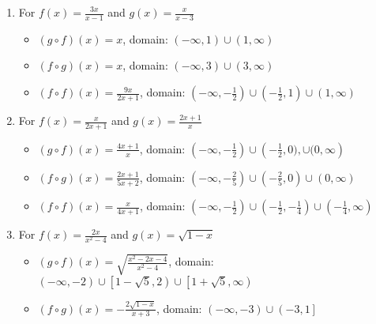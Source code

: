 \begin{enumerate}
\begin{itemize}
\end{itemize}


\item For   $f(x) = \frac{3x}{x-1}$ and $g(x) =\frac{x}{x-3}$

\begin{itemize}

\item  $(g \circ f)(x) =x$, domain: $\left(-\infty, 1\right) \cup (1, \infty)$

\item  $(f \circ g)(x) =x$, domain:  $\left(-\infty, 3\right) \cup (3,\infty)$

\item  $(f \circ f)(x) = \frac{9x}{2x+1}$, domain: $\left(-\infty, -\frac{1}{2}\right) \cup \left(-\frac{1}{2}, 1 \right) \cup \left(1,\infty \right)$

\end{itemize}


\item For    $f(x) = \frac{x}{2x+1}$ and $g(x) = \frac{2x+1}{x}$

\begin{itemize}

\item  $(g \circ f)(x) = \frac{4x+1}{x}$, domain: $\left(-\infty, -\frac{1}{2}\right) \cup \left(-\frac{1}{2}, 0), \cup (0, \infty\right)$

\item  $(f \circ g)(x) = \frac{2x+1}{5x+2}$, domain:  $\left(-\infty, -\frac{2}{5}\right) \cup \left(-\frac{2}{5}, 0\right) \cup (0,\infty)$

\item  $(f \circ f)(x) = \frac{x}{4x+1}$, domain: $\left(-\infty, -\frac{1}{2}\right) \cup \left(-\frac{1}{2}, -\frac{1}{4} \right) \cup \left(-\frac{1}{4},\infty\right)$

\end{itemize}




\item For  $f(x) = \frac{2x}{x^2-4}$ and $g(x) =\sqrt{1-x}$ 

\begin{itemize}

\item  $(g \circ f)(x) =\sqrt{\frac{x^2-2x-4}{x^2-4}}$, domain: $\left(-\infty, -2\right) \cup \left[1-\sqrt{5}, 2\right) \cup \left[1+\sqrt{5}, \infty\right)$

\item  $(f \circ g)(x) = -\frac{2\sqrt{1-x}}{x+3}$, domain: $\left(-\infty, -3\right) \cup \left(-3, 1\right]$


\end{itemize}
\end{enumerate}
